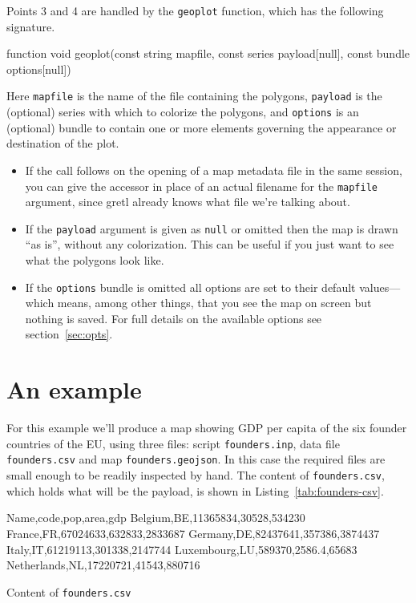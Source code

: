\documentclass{article}
\begin{document}
Points 3 and 4 are handled by the \texttt{geoplot} function, which has
the following signature.
\begin{code}
function void geoplot(const string mapfile,
	              const series payload[null],
	              const bundle options[null])
\end{code}
Here \texttt{mapfile} is the name of the file containing the polygons,
\texttt{payload} is the (optional) series with which to colorize the
polygons, and \texttt{options} is an (optional) bundle to contain one
or more elements governing the appearance or destination of the plot.
\begin{itemize}
\item If the  call follows on the opening of a map
  metadata file in the same session, you can give the accessor
   in place of an actual filename for the
  \texttt{mapfile} argument, since gretl already knows what file we're
  talking about.
\item If the \texttt{payload} argument is given as \texttt{null} or
  omitted then the map is drawn ``as is'', without any
  colorization. This can be useful if you just want to see what the
  polygons look like.
\item If the \texttt{options} bundle is omitted all options are set to
  their default values---which means, among other things, that you see
  the map on screen but nothing is saved. For full details on the
  available options see section~\ref{sec:opts}.
\end{itemize}

\section{An example}
\label{sec:example}

For this example we'll produce a map showing GDP per capita of the six
founder countries of the EU, using three files: script
\texttt{founders.inp}, data file \texttt{founders.csv} and map
\texttt{founders.geojson}. In this case the required files are small
enough to be readily inspected by hand.  The content of
\texttt{founders.csv}, which holds what will be the payload, is shown
in Listing~\ref{tab:founders-csv}.

\begin{script}[htbp]
\begin{scode}
Name,code,pop,area,gdp
Belgium,BE,11365834,30528,534230
France,FR,67024633,632833,2833687
Germany,DE,82437641,357386,3874437
Italy,IT,61219113,301338,2147744
Luxembourg,LU,589370,2586.4,65683
Netherlands,NL,17220721,41543,880716
\end{scode}
\caption{Content of \texttt{founders.csv}}
\label{tab:founders-csv}
\end{script}
\end{document}
